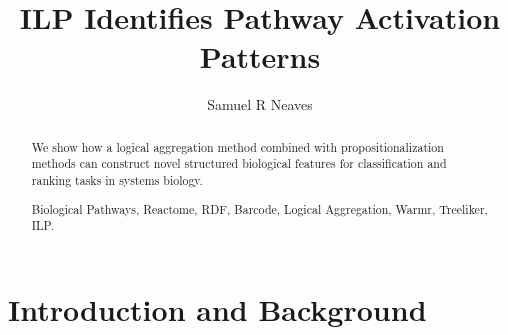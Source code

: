 \documentclass[runningheads,a4paper]{llncs}
\newcommand{\keywords}[1]{\par\addvspace\baselineskip
\noindent\keywordname\enspace\ignorespaces#1}
\begin{document}
\mainmatter  %


\title{ILP Identifies Pathway Activation Patterns}

%
%
\author{Samuel R Neaves}
%


%
%

\maketitle


\begin{abstract}
We show how a logical aggregation method combined 
with propositionalization methods can construct novel structured biological features for 	classification and ranking tasks in systems biology. 

\keywords{Biological Pathways, Reactome, RDF, Barcode, Logical Aggregation, Warmr, Treeliker, ILP.}
\end{abstract}



\section{Introduction and Background}
\end{document}
